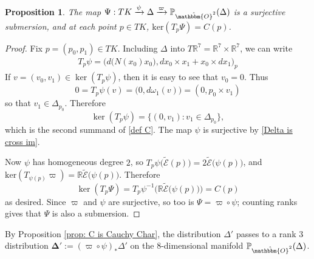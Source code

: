\documentclass[11pt,letterpaper]{amsart}
\newtheorem{prop}[theorem]{Proposition}
\numberwithin{equation}{section}
\newcommand{\oct}{\hat{\mathbbm{O}}}
\begin{document}
    \begin{prop}
        The map $\Psi: TK\xrightarrow{\psi}\Delta\xrightarrow{\varpi}\mathbb{P}_{\oct^2}(\Delta)$ is a surjective submersion, and at each point $p\in TK$, $\mathrm{ker}(T_p\Psi) = C(p)$.
    \end{prop}
    \begin{proof}
        Fix $p = (p_0,p_1)\in TK$. Including $\Delta$ into $T\mathbb R^7 = \mathbb R^7\times \mathbb R^7$, we can write 
        \begin{gather}
            T_p\psi 
            = \Big(d\big(N(x_0)x_0),dx_0\times x_1 + x_0\times dx_1\Big)_p
        \end{gather}
        If $v = (v_0,v_1)\in \ker(T_p\psi)$, then it is easy to see that $v_0=0$. Thus
        \begin{equation}
             0 = T_p\psi(v) = \big(0,d\omega_1(v)\big) = (0,p_0\times v_1)
        \end{equation}
        so that $v_1\in \Delta_{p_0}$. Therefore 
        \begin{equation}
            \ker(T_p\psi) = \{(0,v_1): v_1\in \Delta_{p_0}\},
        \end{equation}
        which is the second summand of \eqref{def C}. The map $\psi$ is surjective by \eqref{Delta is cross im}.

        Now $\psi$ has homogeneous degree $2$, so $T_p\psi\big(\tilde{\mathcal{E}}(p)\big) = 2\tilde{\mathcal{E}}\big(\psi(p)\big)$, and \linebreak[4] $\mathrm{ker}(T_{\psi(p)}\varpi) = \mathbb{R}\tilde{\mathcal{E}}\big(\psi(p)\big)$. Therefore 
        \begin{equation}
            \ker(T_p\Psi) = T_p\psi^{-1}\Big(\mathbb R\tilde{\mathcal{E}}\big(\psi(p)\big)\Big) = C(p)
        \end{equation}
        as desired. Since $\varpi$ and $\psi$ are surjective, so too is $\Psi=\varpi\circ \psi$; counting ranks gives that $\Psi$ is also a submersion.
    \end{proof}

    By Proposition \ref{prop: C is Cauchy Char}, the distribution $\Delta'$ passes to a rank $3$ distribution $\boldsymbol{\Delta}':=(\varpi\circ \psi)_*\Delta'$ on the $8$-dimensional manifold $\mathbb{P}_{\oct^2}(\Delta)$.
\end{document}
